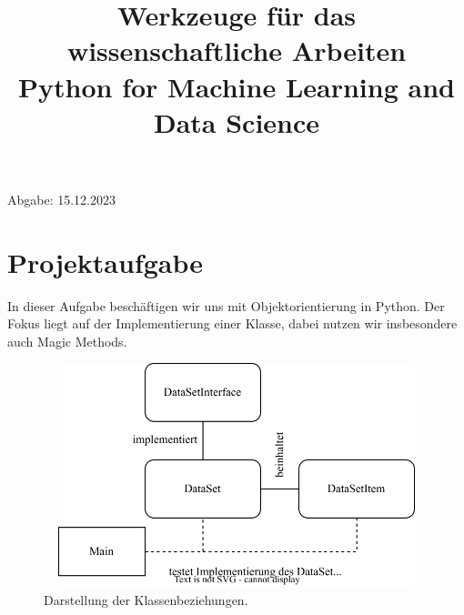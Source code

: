 \documentclass[
oneside,
12pt,
a4paper,
parskip=full
]{scrartcl}
\begin{document}
	\centering
	\title{Werkzeuge für das wissenschaftliche Arbeiten \\
	\large Python for Machine Learning and Data Science}
	\maketitle
\normalfont Abgabe: 15.12.2023\\

\justifying

\tableofcontents
\section{Projektaufgabe}
 In dieser Aufgabe beschäftigen wir uns mit Objektorientierung in Python. Der Fokus liegt auf der Implementierung einer Klasse, dabei nutzen wir insbesondere auch Magic Methods.\\

	\begin{figure}[htbp]
		\centering
			\includegraphics[width=11.5cm, height=6.5cm]{./../diagram/classes_files.png}
		\caption{Darstellung der Klassenbeziehungen.}
		\label{fig:Abbildung 1}
	\end{figure}
\end{document}

